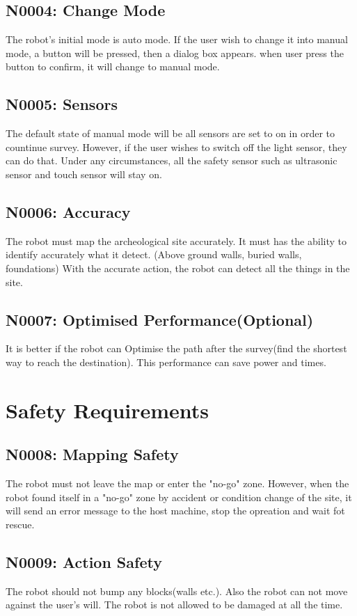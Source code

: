 \documentclass[11pt, a4paper]{report}
\begin{document}
\subsection{N0004: Change Mode}
The robot's initial mode is auto mode. If the user wish to change it into manual mode, a button will be pressed, then a dialog box appears. when user press the button to confirm, it will change to manual mode.


\subsection{N0005: Sensors}
The default state of manual mode will be all sensors are set to on in order to countinue survey. However, if the user wishes to switch off the light sensor, they can do that. Under any circumstances, all the safety sensor such as ultrasonic sensor and touch sensor will stay on. 


\subsection{N0006: Accuracy}
The robot must map the archeological site accurately. It must has the ability to identify accurately
what it detect. (Above ground walls, buried walls, foundations)  With the accurate action, the robot can detect all the things in the site.


\subsection{N0007: Optimised Performance(Optional)}
It is better if the robot can Optimise the path after the survey(find the shortest way to reach the destination). This performance can save power and times.



\section{Safety Requirements}
\subsection{N0008: Mapping Safety}
The robot must not leave the map or enter the "no-go" zone. However, when the robot found itself in a "no-go" zone by accident or condition change of the site, it will send an error message to the host machine, stop the opreation and wait fot rescue.



\subsection{N0009: Action Safety}
The robot should not bump any blocks(walls etc.). Also the robot can not move against the user's will.  The robot is not allowed to be damaged at all the time.
\end{document}
